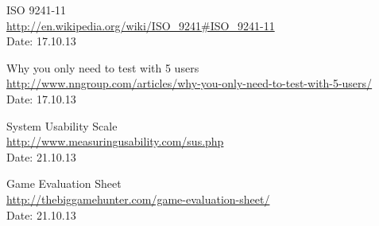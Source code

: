\begin{thebibliography}{99}
	ISO 9241-11 \\
	\href {http://en.wikipedia.org/wiki/ISO_9241#ISO_9241-11}{http://en.wikipedia.org/wiki/ISO\_9241\#ISO\_9241-11} \\
	Date: 17.10.13

	Why you only need to test with 5 users \\
	\href {http://www.nngroup.com/articles/why-you-only-need-to-test-with-5-users/}{http://www.nngroup.com/articles/why-you-only-need-to-test-with-5-users/} \\
	Date: 17.10.13

	System Usability Scale \\
	\href {http://www.measuringusability.com/sus.php}{http://www.measuringusability.com/sus.php} \\
	Date: 21.10.13 

	Game Evaluation Sheet \\
	\href {http://thebiggamehunter.com/game-evaluation-sheet/}{http://thebiggamehunter.com/game-evaluation-sheet/} \\
	Date: 21.10.13
\end{thebibliography}